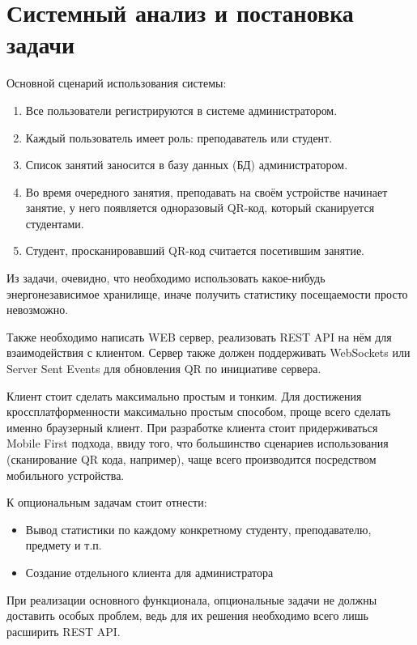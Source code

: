 \section{Системный анализ и постановка задачи}\label{sec:part1}
Основной сценарий использования системы:
\begin{enumerate}
    \item Все пользователи регистрируются в системе администратором.
    \item Каждый пользователь имеет роль: преподаватель или студент.
    \item Список занятий заносится в базу данных (БД) администратором.
    \item Во время очередного занятия, преподавать на своём устройстве начинает занятие, у него появляется одноразовый QR-код, который сканируется студентами.
    \item Студент, просканировавший QR-код считается посетившим занятие.
\end{enumerate}

Из задачи, очевидно, что необходимо использовать какое-нибудь энергонезависимое хранилище, иначе получить статистику посещаемости просто невозможно.

Также необходимо написать WEB сервер, реализовать REST API на нём для взаимодействия с клиентом.
Сервер также должен поддерживать WebSockets или Server Sent Events для обновления QR по инициативе сервера.

Клиент стоит сделать максимально простым и тонким.
Для достижения кроссплатформенности максимально простым способом, проще всего сделать именно браузерный клиент.
При разработке клиента стоит придерживаться Mobile First подхода, ввиду того, что большинство сценариев использования (сканирование QR кода, например), чаще всего производится посредством мобильного устройства.

К опциональным задачам стоит отнести:
\begin{itemize}
    \item Вывод статистики по каждому конкретному студенту, преподавателю, предмету и т.п.
    \item Создание отдельного клиента для администратора
\end{itemize}

При реализации основного функционала, опциональные задачи не должны доставить особых проблем, ведь для их решения необходимо всего лишь расширить REST API.